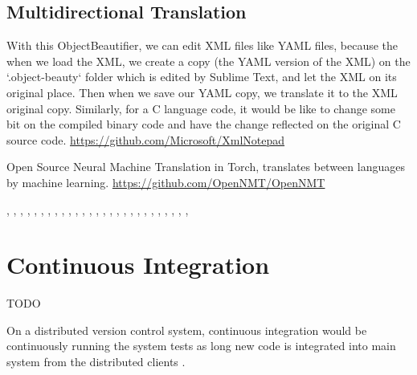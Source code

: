 \subsection{Multidirectional Translation}

With this ObjectBeautifier,
we can edit XML files like YAML files,
because the when we load the XML,
we create a copy (the YAML version of the XML) on the `.object-beauty` folder which is edited by Sublime Text,
and let the XML on its original place.
Then when we save our YAML copy,
we translate it to the XML original copy.
Similarly,
for a C language code,
it would be like to change some bit on the compiled binary code and have the change reflected on the original C source code.
\url{https://github.com/Microsoft/XmlNotepad}

Open Source Neural Machine Translation in Torch,
translates between languages by machine learning.
\url{https://github.com/OpenNMT/OpenNMT}



,
,
,
,
,
,
,
,
,
,
,
,
,
,
,
,
,
,
,
,
,
,
,
,
,
,
,



\section{Continuous Integration}

TODO

On a distributed version control system,
continuous integration would be continuously running the system tests
as long new code is integrated into main system
from the distributed clients \cite{continuousIntegration}.

